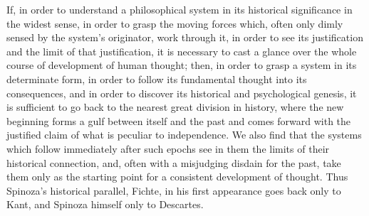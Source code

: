 \documentclass[12pt,a4paper,openany]{book}
\newcommand{\opage}[1]{\marginnote{\footnotesize\textit{[#1]}}}
\begin{document}
\opage{17}If, in order to understand a philosophical system in its historical
significance in the widest sense, in order to grasp the moving forces
which, often only dimly sensed by the system's originator, work through
it, in order to see its justification and the limit of that
justification, it is necessary to cast a glance over the whole course of
development of human thought; then, in order to grasp a system in its
determinate form, in order to follow its fundamental thought into its
consequences, and in order to discover its historical and psychological
genesis, it is sufficient to go back to the nearest great division in
history, where the new beginning forms a gulf between itself and the
past and comes forward with the justified claim of what is peculiar to
independence. We also find that the systems which follow immediately
after such epochs see in them the limits of their historical
connection, and, often with a misjudging disdain for the past, take
them only as the starting point for a consistent development of thought.
Thus Spinoza's historical parallel, Fichte, in his first appearance goes
back only to Kant, and Spinoza himself only to Descartes.
\end{document}
